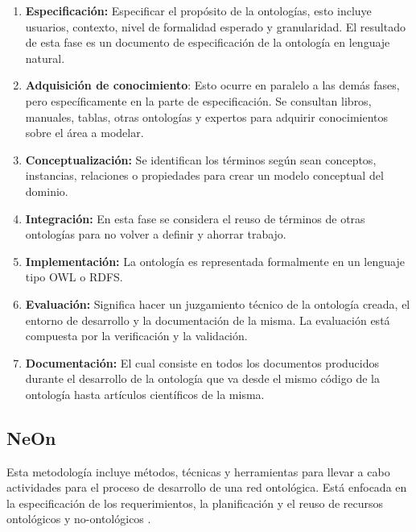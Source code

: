\begin{enumerate}
\item \textbf{Especificación:} Especificar el propósito de la ontologías, esto incluye usuarios, contexto, nivel de formalidad esperado y granularidad. El resultado de esta fase es un documento de especificación de la ontología en lenguaje natural.
\item \textbf{Adquisición de conocimiento}: Esto ocurre en paralelo a las demás fases, pero específicamente en la parte de especificación. Se consultan libros, manuales, tablas, otras ontologías y expertos para adquirir conocimientos sobre el área a modelar.
\item \textbf{Conceptualización:} Se identifican los términos según sean conceptos, instancias, relaciones o propiedades para crear un modelo conceptual del dominio.
\item \textbf{Integración:} En esta fase se considera el reuso de términos de otras ontologías para no volver a definir y ahorrar trabajo.
\item \textbf{Implementación:} La ontología es representada formalmente en un lenguaje tipo OWL o RDFS.
\item \textbf{Evaluación:} Significa hacer un juzgamiento técnico de la ontología creada, el entorno de desarrollo y la documentación de la misma. La evaluación está compuesta por la verificación y la validación.
\item \textbf{Documentación:} El cual consiste en todos los documentos producidos durante el desarrollo de la ontología que va desde el mismo código de la ontología hasta artículos científicos de la misma.
\end{enumerate}


\subsection{NeOn}
\label{subsection:neon}
Esta metodología incluye métodos, técnicas y herramientas para llevar a cabo actividades para el proceso de desarrollo de una red ontológica. Está enfocada en la especificación de los requerimientos, la planificación y el reuso de recursos ontológicos y no-ontológicos \cite{suarez2010neon}.

